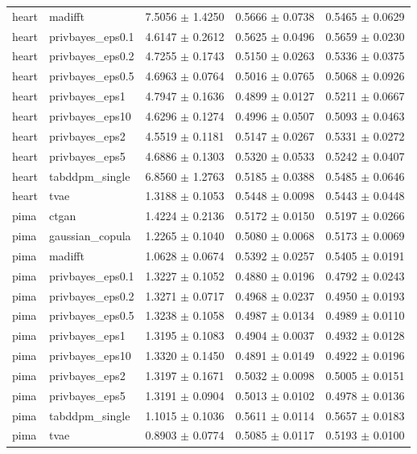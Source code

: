 \begin{tabular}{llccc}
heart & madifft & 7.5056 $\pm$ 1.4250 & 0.5666 $\pm$ 0.0738 & 0.5465 $\pm$ 0.0629 \\
heart & privbayes_eps0.1 & 4.6147 $\pm$ 0.2612 & 0.5625 $\pm$ 0.0496 & 0.5659 $\pm$ 0.0230 \\
heart & privbayes_eps0.2 & 4.7255 $\pm$ 0.1743 & 0.5150 $\pm$ 0.0263 & 0.5336 $\pm$ 0.0375 \\
heart & privbayes_eps0.5 & 4.6963 $\pm$ 0.0764 & 0.5016 $\pm$ 0.0765 & 0.5068 $\pm$ 0.0926 \\
heart & privbayes_eps1 & 4.7947 $\pm$ 0.1636 & 0.4899 $\pm$ 0.0127 & 0.5211 $\pm$ 0.0667 \\
heart & privbayes_eps10 & 4.6296 $\pm$ 0.1274 & 0.4996 $\pm$ 0.0507 & 0.5093 $\pm$ 0.0463 \\
heart & privbayes_eps2 & 4.5519 $\pm$ 0.1181 & 0.5147 $\pm$ 0.0267 & 0.5331 $\pm$ 0.0272 \\
heart & privbayes_eps5 & 4.6886 $\pm$ 0.1303 & 0.5320 $\pm$ 0.0533 & 0.5242 $\pm$ 0.0407 \\
heart & tabddpm_single & 6.8560 $\pm$ 1.2763 & 0.5185 $\pm$ 0.0388 & 0.5485 $\pm$ 0.0646 \\
heart & tvae & 1.3188 $\pm$ 0.1053 & 0.5448 $\pm$ 0.0098 & 0.5443 $\pm$ 0.0448 \\
pima & ctgan & 1.4224 $\pm$ 0.2136 & 0.5172 $\pm$ 0.0150 & 0.5197 $\pm$ 0.0266 \\
pima & gaussian_copula & 1.2265 $\pm$ 0.1040 & 0.5080 $\pm$ 0.0068 & 0.5173 $\pm$ 0.0069 \\
pima & madifft & 1.0628 $\pm$ 0.0674 & 0.5392 $\pm$ 0.0257 & 0.5405 $\pm$ 0.0191 \\
pima & privbayes_eps0.1 & 1.3227 $\pm$ 0.1052 & 0.4880 $\pm$ 0.0196 & 0.4792 $\pm$ 0.0243 \\
pima & privbayes_eps0.2 & 1.3271 $\pm$ 0.0717 & 0.4968 $\pm$ 0.0237 & 0.4950 $\pm$ 0.0193 \\
pima & privbayes_eps0.5 & 1.3238 $\pm$ 0.1058 & 0.4987 $\pm$ 0.0134 & 0.4989 $\pm$ 0.0110 \\
pima & privbayes_eps1 & 1.3195 $\pm$ 0.1083 & 0.4904 $\pm$ 0.0037 & 0.4932 $\pm$ 0.0128 \\
pima & privbayes_eps10 & 1.3320 $\pm$ 0.1450 & 0.4891 $\pm$ 0.0149 & 0.4922 $\pm$ 0.0196 \\
pima & privbayes_eps2 & 1.3197 $\pm$ 0.1671 & 0.5032 $\pm$ 0.0098 & 0.5005 $\pm$ 0.0151 \\
pima & privbayes_eps5 & 1.3191 $\pm$ 0.0904 & 0.5013 $\pm$ 0.0102 & 0.4978 $\pm$ 0.0136 \\
pima & tabddpm_single & 1.1015 $\pm$ 0.1036 & 0.5611 $\pm$ 0.0114 & 0.5657 $\pm$ 0.0183 \\
pima & tvae & 0.8903 $\pm$ 0.0774 & 0.5085 $\pm$ 0.0117 & 0.5193 $\pm$ 0.0100 \\
\bottomrule
\end{tabular}